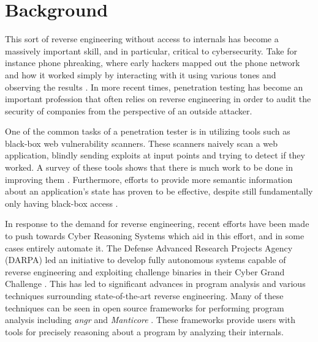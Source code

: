 \chapter{Background}

This sort of reverse engineering without access to internals has become a massively important skill, and in particular, critical to cybersecurity.
Take for instance phone phreaking, where early hackers mapped out the phone network and how it worked simply by interacting with it using various tones and observing the results \cite{mitnick2011art}.
In more recent times, penetration testing has become an important profession that often relies on reverse engineering in order to audit the security of companies from the perspective of an outside attacker.

One of the common tasks of a penetration tester is in utilizing tools such as black-box web vulnerability scanners.
These scanners naively scan a web application, blindly sending exploits at input points and trying to detect if they worked.
A survey of these tools shows that there is much work to be done in improving them \cite{doupe2010johnny}.
Furthermore, efforts to provide more semantic information about an application's state has proven to be effective, despite still fundamentally only having black-box access \cite{doupe2012enemy}.

In response to the demand for reverse engineering, recent efforts have been made to push towards Cyber Reasoning Systems which aid in this effort, and in some cases entirely automate it.
The Defense Advanced Research Projects Agency (DARPA) led an initiative to develop fully autonomous systems capable of reverse engineering and exploiting challenge binaries in their Cyber Grand Challenge \cite{shellphish2017cyber}.
This has led to significant advances in program analysis and various techniques surrounding state-of-the-art reverse engineering.
Many of these techniques can be seen in open source frameworks for performing program analysis including \textit{angr} and \textit{Manticore} \cite{shoshitaishvili2016state, stephens2016driller, shoshitaishvili2015firmalice, trailofbitsmanticore}.
These frameworks provide users with tools for precisely reasoning about a program by analyzing their internals.
